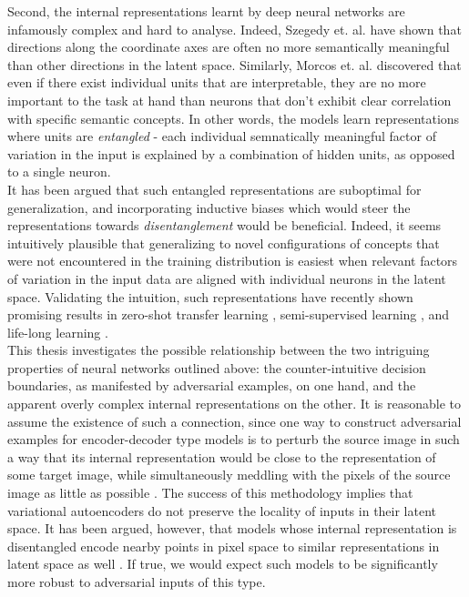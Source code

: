 \documentclass{report}
\begin{document}
\noindent Second, the internal representations learnt by deep neural networks are infamously complex and hard to analyse. Indeed, Szegedy et. al. \cite{intriguing-properties} have shown that directions along the coordinate axes are often no more semantically meaningful than other directions in the latent space. Similarly, Morcos et. al. \cite{importance-single-directions} discovered that even if there exist individual units that are interpretable, they are no more important to the task at hand than neurons that don't exhibit clear correlation with specific semantic concepts. In other words, the models learn representations where units are \textit{entangled} - each individual semnatically meaningful factor of variation in the input is explained by a combination of hidden units, as opposed to a single neuron. \\

\noindent It has been argued \cite{bengio-representation} that such entangled representations are suboptimal for generalization, and incorporating inductive biases which would steer the representations towards \textit{disentanglement} would be beneficial. Indeed, it seems intuitively plausible that generalizing to novel configurations of concepts that were not encountered in the training distribution is easiest when relevant factors of variation in the input data are aligned with individual neurons in the latent space. Validating the intuition, such representations have recently shown promising results in zero-shot transfer learning \cite{darla}, semi-supervised learning \cite{dgpose}, and life-long learning \cite{vase}. \\

\noindent This thesis investigates the possible relationship between the two intriguing properties of neural networks outlined above: the counter-intuitive decision boundaries, as manifested by adversarial examples, on one hand, and the apparent overly complex internal representations on the other. It is reasonable to assume the existence of such a connection, since one way to construct adversarial examples for encoder-decoder type models is to perturb the source image in such a way that its internal representation would be close to the representation of some target image, while simultaneously meddling with the pixels of the source image as little as possible \cite{kos-gen-adv, tabacof-gen-adv}. The success of this methodology implies that variational autoencoders do not preserve the locality of inputs in their latent space. It has been argued, however, that models whose internal representation is disentangled encode nearby points in pixel space to similar representations in latent space as well \cite{beta-vae}. If true, we would expect such models to be significantly more robust to adversarial inputs of this type. \\
\end{document}
